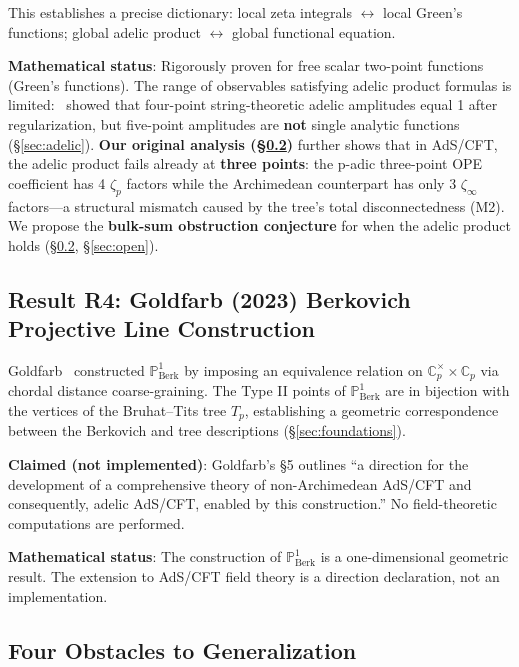 \documentclass[11pt,a4paper]{article}
\newcommand{\Cp}{\mathbb{C}_p}
\newcommand{\PoneBerk}{\mathbb{P}^1_{\mathrm{Berk}}}
\newcommand{\BirTits}{Bruhat--Tits}
\begin{document}
This establishes a precise dictionary: local zeta integrals $\leftrightarrow$ local Green's functions; global adelic product $\leftrightarrow$ global functional equation.

\textbf{Mathematical status}: Rigorously proven for free scalar two-point functions (Green's functions). The range of observables satisfying adelic product formulas is limited:~\cite{J22} showed that four-point string-theoretic adelic amplitudes equal 1 after regularization, but five-point amplitudes are \textbf{not} single analytic functions (\S\ref{sec:adelic}). \textbf{Our original analysis (\S\ref{sec:obstacles})} further shows that in AdS/CFT, the adelic product fails already at \textbf{three points}: the p-adic three-point OPE coefficient has 4 $\zeta_p$ factors while the Archimedean counterpart has only 3 $\zeta_\infty$ factors---a structural mismatch caused by the tree's total disconnectedness (M2). We propose the \textbf{bulk-sum obstruction conjecture} for when the adelic product holds (\S\ref{sec:obstacles}, \S\ref{sec:open}).

\subsection{Result R4: Goldfarb (2023) Berkovich Projective Line Construction}
\label{sec:goldfarb}

Goldfarb~\cite{G23} constructed $\PoneBerk$ by imposing an equivalence relation on $\Cp^\times \times \Cp$ via chordal distance coarse-graining. The Type II points of $\PoneBerk$ are in bijection with the vertices of the \BirTits{} tree $T_p$, establishing a geometric correspondence between the Berkovich and tree descriptions (\S\ref{sec:foundations}).

\textbf{Claimed (not implemented)}: Goldfarb's \S5 outlines ``a direction for the development of a comprehensive theory of non-Archimedean AdS/CFT and consequently, adelic AdS/CFT, enabled by this construction.'' No field-theoretic computations are performed.

\textbf{Mathematical status}: The construction of $\PoneBerk$ is a one-dimensional geometric result. The extension to AdS/CFT field theory is a direction declaration, not an implementation.

\subsection{Four Obstacles to Generalization}
\label{sec:obstacles}
\end{document}
